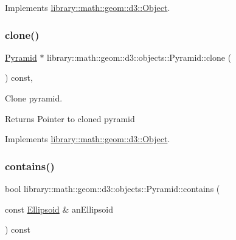 Implements \hyperlink{classlibrary_1_1math_1_1geom_1_1d3_1_1_object_a5fc47b1ee5d9a28efc6010d3d1512470}{library\+::math\+::geom\+::d3\+::\+Object}.

\mbox{\label{classlibrary_1_1math_1_1geom_1_1d3_1_1objects_1_1_pyramid_a734bc02bbfec62647743649bf5d2b706}} 
\subsubsection{\texorpdfstring{clone()}{clone()}}
{\footnotesize\ttfamily \hyperlink{classlibrary_1_1math_1_1geom_1_1d3_1_1objects_1_1_pyramid}{Pyramid} $\ast$ library\+::math\+::geom\+::d3\+::objects\+::\+Pyramid\+::clone (\begin{DoxyParamCaption}{ }\end{DoxyParamCaption}) const\hspace{0.3cm}{\ttfamily [override]}, {\ttfamily [virtual]}}



Clone pyramid. 

\begin{DoxyReturn}{Returns}
Pointer to cloned pyramid 
\end{DoxyReturn}


Implements \hyperlink{classlibrary_1_1math_1_1geom_1_1d3_1_1_object_a1a784c6b359e0eb97cd34fabc42f2f3f}{library\+::math\+::geom\+::d3\+::\+Object}.

\mbox{\label{classlibrary_1_1math_1_1geom_1_1d3_1_1objects_1_1_pyramid_a32e8fd53701cd4d2c0c6b377ca7902c9}} 
\subsubsection{\texorpdfstring{contains()}{contains()}}
{\footnotesize\ttfamily bool library\+::math\+::geom\+::d3\+::objects\+::\+Pyramid\+::contains (\begin{DoxyParamCaption}\item[{const \hyperlink{classlibrary_1_1math_1_1geom_1_1d3_1_1objects_1_1_ellipsoid}{Ellipsoid} \&}]{an\+Ellipsoid }\end{DoxyParamCaption}) const}



